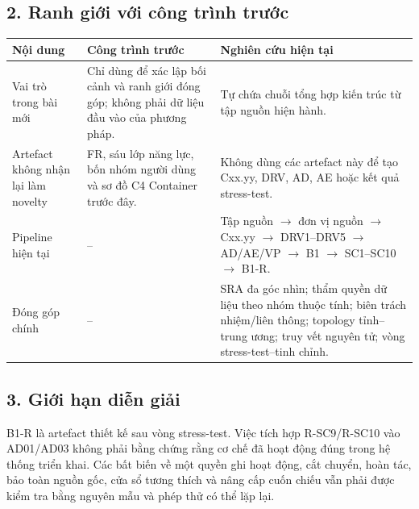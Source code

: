 \documentclass[a4paper,9pt]{article}
\begin{document}
\subsection*{2. Ranh giới với công trình trước}
\begin{tabularx}{\textwidth}{@{}p{5.0cm}p{7.2cm}X@{}}
\toprule
\textbf{Nội dung} & \textbf{Công trình trước} & \textbf{Nghiên cứu hiện tại}\\
\midrule
Vai trò trong bài mới & Chỉ dùng để xác lập bối cảnh và ranh giới đóng góp; không phải dữ liệu đầu vào của phương pháp. & Tự chứa chuỗi tổng hợp kiến trúc từ tập nguồn hiện hành.\\
\addlinespace
Artefact không nhận lại làm novelty & FR, sáu lớp năng lực, bốn nhóm người dùng và sơ đồ C4 Container trước đây. & Không dùng các artefact này để tạo Cxx.yy, DRV, AD, AE hoặc kết quả stress-test.\\
\addlinespace
Pipeline hiện tại & -- & Tập nguồn $\rightarrow$ đơn vị nguồn $\rightarrow$ Cxx.yy $\rightarrow$ DRV1--DRV5 $\rightarrow$ AD/AE/VP $\rightarrow$ B1 $\rightarrow$ SC1--SC10 $\rightarrow$ B1-R.\\
\addlinespace
Đóng góp chính & -- & SRA đa góc nhìn; thẩm quyền dữ liệu theo nhóm thuộc tính; biên trách nhiệm/liên thông; topology tỉnh--trung ương; truy vết nguyên tử; vòng stress-test--tinh chỉnh.\\
\bottomrule
\end{tabularx}

\subsection*{3. Giới hạn diễn giải}
B1-R là artefact thiết kế sau vòng stress-test. Việc tích hợp R-SC9/R-SC10 vào AD01/AD03 không phải bằng chứng rằng cơ chế đã hoạt động đúng trong hệ thống triển khai. Các bất biến về một quyền ghi hoạt động, cắt chuyển, hoàn tác, bảo toàn nguồn gốc, cửa sổ tương thích và nâng cấp cuốn chiếu vẫn phải được kiểm tra bằng nguyên mẫu và phép thử có thể lặp lại.
\end{document}
